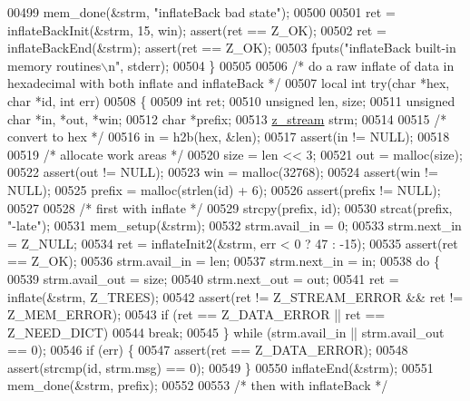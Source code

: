 \begin{DoxyCode}
{{{{{00499     mem\_done(&strm, \textcolor{stringliteral}{"inflateBack bad state"});
00500 
00501     ret = inflateBackInit(&strm, 15, win);      assert(ret == Z\_OK);
00502     ret = inflateBackEnd(&strm);                assert(ret == Z\_OK);
00503     fputs(\textcolor{stringliteral}{"inflateBack built-in memory routines\(\backslash\)n"}, stderr);
00504 \}
00505 
00506 \textcolor{comment}{/* do a raw inflate of data in hexadecimal with both inflate and inflateBack */}
00507 local \textcolor{keywordtype}{int} \textcolor{keywordflow}{try}(\textcolor{keywordtype}{char} *hex, \textcolor{keywordtype}{char} *\textcolor{keywordtype}{id}, \textcolor{keywordtype}{int} err)
00508 \{
00509     \textcolor{keywordtype}{int} ret;
00510     \textcolor{keywordtype}{unsigned} len, size;
00511     \textcolor{keywordtype}{unsigned} \textcolor{keywordtype}{char} *in, *out, *win;
00512     \textcolor{keywordtype}{char} *prefix;
00513     \hyperlink{structz__stream__s}{z\_stream} strm;
00514 
00515     \textcolor{comment}{/* convert to hex */}
00516     in = h2b(hex, &len);
00517     assert(in != NULL);
00518 
00519     \textcolor{comment}{/* allocate work areas */}
00520     size = len << 3;
00521     out = malloc(size);
00522     assert(out != NULL);
00523     win = malloc(32768);
00524     assert(win != NULL);
00525     prefix = malloc(strlen(\textcolor{keywordtype}{id}) + 6);
00526     assert(prefix != NULL);
00527 
00528     \textcolor{comment}{/* first with inflate */}
00529     strcpy(prefix, \textcolor{keywordtype}{id});
00530     strcat(prefix, \textcolor{stringliteral}{"-late"});
00531     mem\_setup(&strm);
00532     strm.avail\_in = 0;
00533     strm.next\_in = Z\_NULL;
00534     ret = inflateInit2(&strm, err < 0 ? 47 : -15);
00535     assert(ret == Z\_OK);
00536     strm.avail\_in = len;
00537     strm.next\_in = in;
00538     \textcolor{keywordflow}{do} \{
00539         strm.avail\_out = size;
00540         strm.next\_out = out;
00541         ret = inflate(&strm, Z\_TREES);
00542         assert(ret != Z\_STREAM\_ERROR && ret != Z\_MEM\_ERROR);
00543         \textcolor{keywordflow}{if} (ret == Z\_DATA\_ERROR || ret == Z\_NEED\_DICT)
00544             \textcolor{keywordflow}{break};
00545     \} \textcolor{keywordflow}{while} (strm.avail\_in || strm.avail\_out == 0);
00546     \textcolor{keywordflow}{if} (err) \{
00547         assert(ret == Z\_DATA\_ERROR);
00548         assert(strcmp(\textcolor{keywordtype}{id}, strm.msg) == 0);
00549     \}
00550     inflateEnd(&strm);
00551     mem\_done(&strm, prefix);
00552 
00553     \textcolor{comment}{/* then with inflateBack */}
}}}}}
\end{DoxyCode}

